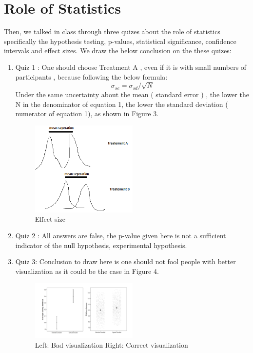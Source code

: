 \section{Role of Statistics}
Then, we talked in class through three quizes about the role of statistics specifically the hypothesis testing, p-values, statistical significance, confidence intervals and effect sizes. We draw the below conclusion on the these quizes: 
\begin{enumerate}
  \item Quiz 1 : One should choose Treatment A , even if it is with small numbers of participants , because following the below formula: \begin{equation}
  {\sigma _{se}}={\sigma _{sd}}/ \sqrt{N}
\end{equation}
Under the same uncertainty about the mean ( standard error ) , the lower the N in the denominator of equation 1, the lower the standard deviation ( numerator of equation 1), as shown in Figure 3. 

\begin{figure}[ht]
  \begin{center}
    \includegraphics[width=0.5\textwidth]{figures/treatementA.png}
    \caption{
    Effect size
      }
    \label{fig:badges}
  \end{center}
\end{figure}
  

 \item Quiz 2 : All answers are false, the p-value given here is not a sufficient indicator of the null hypothesis, experimental hypothesis. 
 
 \item Quiz 3: Conclusion to draw here is one should not fool people with better visualization as it could be the case in Figure 4. 

 \begin{figure}[ht]
  \begin{center}
    \includegraphics[width=0.5\textwidth]{figures/quiz3.png}
    \caption{
    Left: Bad visualization Right: Correct visualization
      }
    \label{fig:quiz3}
  \end{center}
\end{figure}

 
\end{enumerate}


